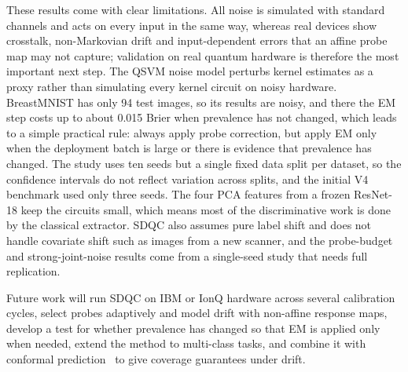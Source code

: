 \documentclass[conference]{IEEEtran}
\begin{document}
These results come with clear limitations. All noise is simulated with standard channels and acts on every input in the same way, whereas real devices show crosstalk, non-Markovian drift and input-dependent errors that an affine probe map may not capture; validation on real quantum hardware is therefore the most important next step. The QSVM noise model perturbs kernel estimates as a proxy rather than simulating every kernel circuit on noisy hardware. BreastMNIST has only 94 test images, so its results are noisy, and there the EM step costs up to about 0.015 Brier when prevalence has not changed, which leads to a simple practical rule: always apply probe correction, but apply EM only when the deployment batch is large or there is evidence that prevalence has changed. The study uses ten seeds but a single fixed data split per dataset, so the confidence intervals do not reflect variation across splits, and the initial V4 benchmark used only three seeds. The four PCA features from a frozen ResNet-18 keep the circuits small, which means most of the discriminative work is done by the classical extractor. SDQC also assumes pure label shift and does not handle covariate shift such as images from a new scanner, and the probe-budget and strong-joint-noise results come from a single-seed study that needs full replication.

Future work will run SDQC on IBM or IonQ hardware across several calibration cycles, select probes adaptively and model drift with non-affine response maps, develop a test for whether prevalence has changed so that EM is applied only when needed, extend the method to multi-class tasks, and combine it with conformal prediction~\cite{park2024} to give coverage guarantees under drift.
\end{document}

